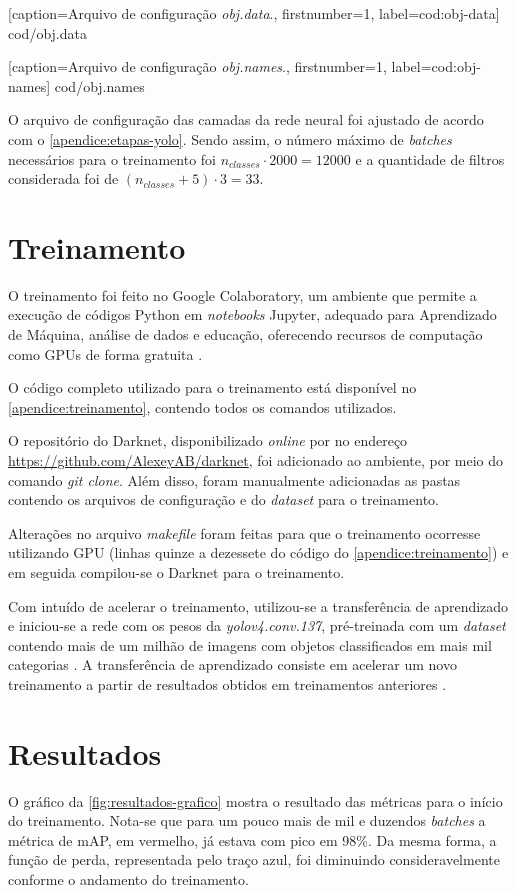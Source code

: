 
[caption=Arquivo de configuração \textit{obj.data}.,
firstnumber=1,
label=cod:obj-data]
{cod/obj.data}


[caption=Arquivo de configuração \textit{obj.names}.,
firstnumber=1,
label=cod:obj-names]
{cod/obj.names}

O arquivo de configuração das camadas da rede neural foi ajustado de acordo com o \autoref{apendice:etapas-yolo}. Sendo assim, o número máximo de \textit{batches} necessários para o treinamento foi $n_{classes} \cdot 2000 = 12000$ e a quantidade de filtros considerada foi de $(n_{classes} + 5) \cdot 3 = 33$.

\section{Treinamento} \label{cap:treinamento-treinamento}
O treinamento foi feito no Google Colaboratory, um ambiente que permite a execução de códigos Python em \textit{notebooks} Jupyter, adequado para Aprendizado de Máquina, análise de dados e educação, oferecendo recursos de computação como GPUs de forma gratuita \cite{ref:Colab}.

O código completo utilizado para o treinamento está disponível no \autoref{apendice:treinamento}, contendo todos os comandos utilizados.

O repositório do Darknet, disponibilizado \textit{online} por  no endereço \url{https://github.com/AlexeyAB/darknet}, foi adicionado ao ambiente, por meio do comando \textit{git clone}. Além disso, foram manualmente adicionadas as pastas contendo os arquivos de configuração e do \textit{dataset} para o treinamento.

Alterações no arquivo \textit{makefile} foram feitas para que o treinamento ocorresse utilizando GPU (linhas quinze a dezessete do código do \autoref{apendice:treinamento}) e em seguida compilou-se o Darknet para o treinamento.

Com intuído de acelerar o treinamento, utilizou-se a transferência de aprendizado e iniciou-se a rede com os pesos da \textit{yolov4.conv.137}, pré-treinada com um \textit{dataset} contendo mais de um milhão de imagens com objetos classificados em mais mil categorias \cite{ref:Redmon-et-al}. A transferência de aprendizado consiste em acelerar um novo treinamento a partir de resultados obtidos em treinamentos anteriores \cite{ref:Cai-Bileschi-Nielsen}. 

\section{Resultados} \label{cap:treinamento-resultados}
O gráfico da \autoref{fig:resultados-grafico} mostra o resultado das métricas para o início do treinamento. Nota-se que para um pouco mais de mil e duzendos \textit{batches} a métrica de mAP, em vermelho, já estava com pico em 98\%. Da mesma forma, a função de perda, representada pelo traço azul, foi diminuindo consideravelmente conforme o andamento do treinamento.

